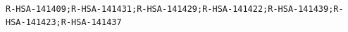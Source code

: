 \documentclass[
  letterpaper,
  DIV=11,
  numbers=noendperiod]{scrartcl}
\begin{document}
\begin{verbatim}
                                                                                                                                                                                                                                                                                                                                                                                                                                                                                                                                                                                                                                                                                                                                                                                                                                                                                                                                                                                                                                                                                                                                                                                                                                                                                                                                                                                                                                                                                                                                                                                                                                                                                                                                                                                                                                                                                                                                                                                                                                                                                                                                                                                                                                                                                                                                                                                                                                                                                                                                                                                                                                                                                                                   R-HSA-141409;R-HSA-141431;R-HSA-141429;R-HSA-141422;R-HSA-141439;R-HSA-141423;R-HSA-141437

\end{verbatim}
\end{document}
